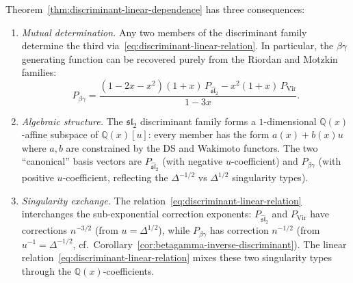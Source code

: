 \begin{remark}\label{rem:linear-dependence-consequences}
Theorem~\ref{thm:discriminant-linear-dependence} has three consequences:
\begin{enumerate}
\item \emph{Mutual determination.}
Any two members of the discriminant family determine the third via~\eqref{eq:discriminant-linear-relation}.  In particular, the $\beta\gamma$ generating function can be recovered purely from the Riordan and Motzkin families:
\[
P_{\beta\gamma} = \frac{(1{-}2x{-}x^2)(1{+}x)\, P_{\widehat{\mathfrak{sl}}_2}
  - x^2(1{+}x)\, P_{\mathrm{Vir}}}{1{-}3x}.
\]
\item \emph{Algebraic structure.}
The $\mathfrak{sl}_2$ discriminant family forms a $1$-dimensional
$\mathbb{Q}(x)$-affine subspace of $\mathbb{Q}(x)[u]$:
every member has the form $a(x) + b(x)u$ where
$a, b$ are constrained by the DS and Wakimoto functors.
The two ``canonical'' basis vectors are
$P_{\widehat{\mathfrak{sl}}_2}$ (with negative $u$-coefficient)
and $P_{\beta\gamma}$ (with positive $u$-coefficient, reflecting the
$\Delta^{-1/2}$ vs $\Delta^{1/2}$ singularity types).
\item \emph{Singularity exchange.}
The relation~\eqref{eq:discriminant-linear-relation} interchanges
the sub-exponential correction exponents:
$P_{\widehat{\mathfrak{sl}}_2}$ and $P_{\mathrm{Vir}}$ have corrections
$n^{-3/2}$ (from $u = \Delta^{1/2}$),
while $P_{\beta\gamma}$ has correction $n^{-1/2}$
(from $u^{-1} = \Delta^{-1/2}$, cf.\ Corollary~\ref{cor:betagamma-inverse-discriminant}).
The linear relation~\eqref{eq:discriminant-linear-relation}
mixes these two singularity types through the
$\mathbb{Q}(x)$-coefficients.
\end{enumerate}
\end{remark}

